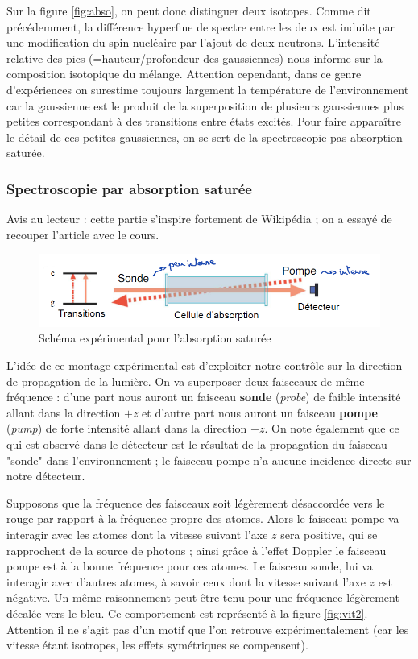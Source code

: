 Sur la figure \ref{fig:abso}, on peut donc distinguer deux isotopes. Comme dit précédemment, la différence hyperfine de spectre entre les deux est induite par une modification du spin nucléaire par l'ajout de deux neutrons. L'intensité relative des pics (=hauteur/profondeur des gaussiennes) nous informe sur la composition isotopique du mélange. Attention cependant, dans ce genre d'expériences on surestime toujours largement la température de l'environnement car la gaussienne est le produit de la superposition de plusieurs gaussiennes plus petites correspondant à des transitions entre états excités. Pour faire apparaître le détail de ces petites gaussiennes, on se sert de la spectroscopie pas absorption saturée.


\subsubsection{Spectroscopie par absorption saturée}
Avis au lecteur : cette partie s'inspire fortement de Wikipédia ; on a essayé de recouper l'article avec le cours.\\
\begin{figure}[htp]
    \centering
    \includegraphics[width=\textwidth]{Images2/AbsoSatu.PNG}
    \caption{Schéma expérimental pour l'absorption saturée}
\label{fig:absoSatu}
\end{figure}
L'idée de ce montage expérimental est d'exploiter notre contrôle sur la direction de propagation de la lumière. On va superposer deux faisceaux de même fréquence : d'une part nous auront un faisceau \textbf{sonde} (\textit{probe}) de faible intensité allant dans la direction $+z$ et d'autre part nous auront un faisceau \textbf{pompe} (\textit{pump}) de forte intensité allant dans la direction $-z$. On note également que ce qui est observé dans le détecteur est le résultat de la propagation du faisceau "sonde" dans l'environnement ; le faisceau pompe n'a aucune incidence directe sur notre détecteur.

Supposons que la fréquence des faisceaux soit légèrement désaccordée vers le rouge par rapport à la fréquence propre des atomes. Alors le faisceau pompe va interagir avec les atomes dont la vitesse suivant l'axe $z$ sera positive, qui se rapprochent de la source de photons ; ainsi grâce à l'effet Doppler le faisceau pompe est à la bonne fréquence pour ces atomes. Le faisceau sonde, lui va interagir avec d'autres atomes, à savoir ceux dont la vitesse suivant l'axe $z$ est négative. Un même raisonnement peut être tenu pour une fréquence légèrement décalée vers le bleu. Ce comportement est représenté à la figure \ref{fig:vit2}. Attention il ne s'agit pas d'un motif que l'on retrouve expérimentalement (car les vitesse étant isotropes, les effets symétriques se compensent).

